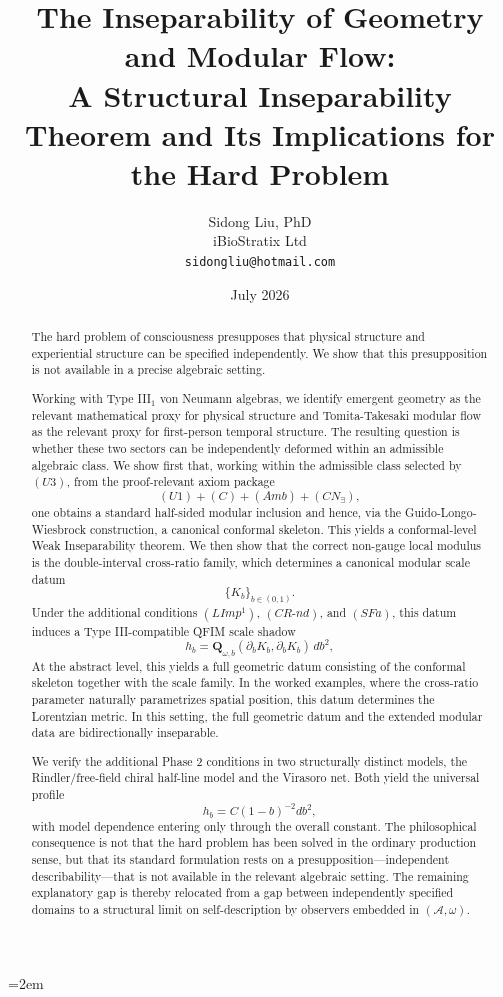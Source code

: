 \documentclass[12pt]{article}
\title{%
  \textbf{The Inseparability of Geometry and Modular Flow:}\\
  \textbf{A Structural Inseparability Theorem and Its Implications for the Hard Problem}%
}
\author{
  Sidong Liu, PhD \\
  \small iBioStratix Ltd \\
  \small \texttt{sidongliu@hotmail.com}
}
\date{July 2026}
\theoremstyle{definition}
\theoremstyle{remark}
\begin{document}
\emergencystretch=2em
\raggedbottom
{}

\maketitle

\begin{abstract}
The hard problem of consciousness presupposes that physical structure
and experiential structure can be specified independently. We show that
this presupposition is not available in a precise algebraic setting.

Working with Type III\(_1\) von Neumann algebras, we identify emergent
geometry as the relevant mathematical proxy for physical structure and
Tomita-Takesaki modular flow as the relevant proxy for first-person
temporal structure. The resulting question is whether these two sectors
can be independently deformed within an admissible algebraic class. We
show first that, working within the admissible class selected by
\((U3)\), from the proof-relevant axiom package \[
(U1)+(C)+(Amb)+(CN_\exists),
\] one obtains a standard half-sided modular inclusion and hence, via
the Guido-Longo-Wiesbrock construction, a canonical conformal skeleton.
This yields a conformal-level Weak Inseparability theorem. We then show
that the correct non-gauge local modulus is the double-interval
cross-ratio family, which determines a canonical modular scale datum \[
\{K_b\}_{b\in(0,1)}.
\] Under the additional conditions \((LImp^1)\), \((CR\text{-}nd)\), and
\((SFa)\), this datum induces a Type III-compatible QFIM scale shadow \[
h_b=\mathbf{Q}_{\omega,b}(\partial_b K_b,\partial_b K_b)\,db^2,
\] At the abstract level, this yields a full geometric datum consisting
of the conformal skeleton together with the scale family. In the worked
examples, where the cross-ratio parameter naturally parametrizes spatial
position, this datum determines the Lorentzian metric. In this setting,
the full geometric datum and the extended modular data are
bidirectionally inseparable.

We verify the additional Phase 2 conditions in two structurally distinct
models, the Rindler/free-field chiral half-line model and the Virasoro
net. Both yield the universal profile \[
h_b=C(1-b)^{-2}db^2,
\] with model dependence entering only through the overall constant. The
philosophical consequence is not that the hard problem has been solved
in the ordinary production sense, but that its standard formulation
rests on a presupposition---independent describability---that is not
available in the relevant algebraic setting. The remaining explanatory gap is
thereby relocated from a gap between independently specified domains to
a structural limit on self-description by observers embedded in
\((\mathcal{A},\omega)\).
 \end{abstract}
\end{document}
